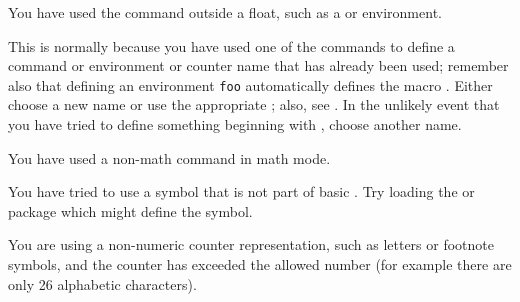 \begin{plainlist}
    You have used the \cmd{\caption} command outside a float, such as
a  or  environment. 


\item[]

    This is normally because you have used one of the 
commands to define a command or environment or counter name that has 
already been used; remember also that defining an environment \verb?foo?
automatically defines the macro . Either choose a new name or
use the appropriate ; also, see .
In the unlikely event that you have
tried to define something beginning with , choose another name.
\label{alreadydefined}



\item[] 

    You have used a non-math command in math mode.


\item[]

    You have tried to use a symbol that is not part of basic \ltx.
Try loading the  or  package which
might define the symbol.




\item[] 

    You are using a non-numeric counter representation, such as letters
or footnote symbols, and the counter has exceeded the allowed number
(for example there are only 26 alphabetic characters).




\end{plainlist}
